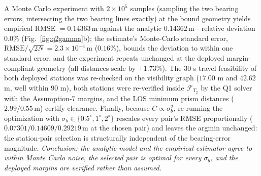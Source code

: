 A Monte Carlo experiment with $2\times10^{5}$ samples (sampling the two bearing errors,
intersecting the two bearing lines exactly) at the bound geometry yields empirical
RMSE $=0.14363\,\mathrm{m}$ against the analytic $0.14362\,\mathrm{m}$---relative
deviation $0.0\%$ (Fig.~\ref{fig:q2gamma}b); the estimate's Monte-Carlo standard
error, $\mathrm{RMSE}/\sqrt{2N}=2.3\times10^{-4}\,\mathrm{m}$ ($0.16\%$), bounds the
deviation to within one standard error, and the experiment repeats unchanged at the
deployed margin-compliant geometry (all distances scale by $+1.73\%$). The 30-s
travel feasibility of both deployed stations was re-checked on the visibility graph
($17.00$ m and $42.62$ m, well within $90$ m), both stations were re-verified inside
$\mathcal{F}_{T_2}$ by the Q1 solver with the Assumption-7 margins, and the LOS
minimum prism distances ($2.99/0.55\,\mathrm{m}$) certify clearance. Finally,
because $C\propto\sigma_b^2$, re-running the optimization with
$\sigma_b\in\{0.5^\circ,1^\circ,2^\circ\}$ rescales every pair's RMSE proportionally
($0.07301/0.14609/0.29219\,\mathrm{m}$ at the chosen pair) and leaves the argmin unchanged: the
station-pair selection is structurally independent of the bearing-error magnitude.
\emph{Conclusion: the analytic model and the empirical estimator agree to within
Monte Carlo noise, the selected pair is optimal for every $\sigma_b$, and the
deployed margins are verified rather than assumed.}
